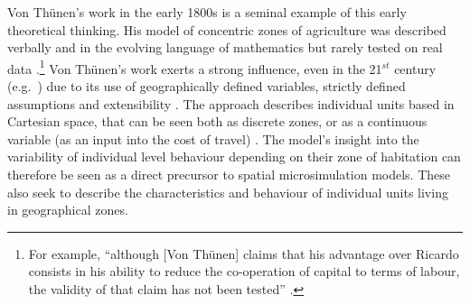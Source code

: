 Von Th\"{u}nen's work in the early 1800s is a seminal example of this early
theoretical thinking. His model of concentric zones of agriculture was
described verbally and in the evolving language of mathematics but rarely tested
on real data \citep{Moore1895-thesis}.\footnote{For
example, ``although [Von
Th\"{u}nen] claims that his advantage over Ricardo consists in his ability to
reduce the co-operation of capital to terms of labour, the validity of that
claim has not been tested'' \citep[p.~126]{Moore1895-thesis}.
} 
Von Th\"{u}nen's work exerts a strong
influence, even in the 21$^{st}$ century (e.g.~\citealp{lankoski2008bioenergy}) 
due to its use of geographically defined variables, strictly 
defined assumptions and extensibility \citep{sasaki2003agent}. 
The approach describes individual units based in
Cartesian space, that can be seen both as discrete zones, or as
a continuous variable (as an input into the cost of travel)
\citep{Stevens1968a}. The model's insight into the variability of
individual level behaviour depending on their zone of habitation can therefore
be seen as a direct precursor to spatial microsimulation models. These also
seek to describe the characteristics and behaviour of individual units living in
geographical zones.

